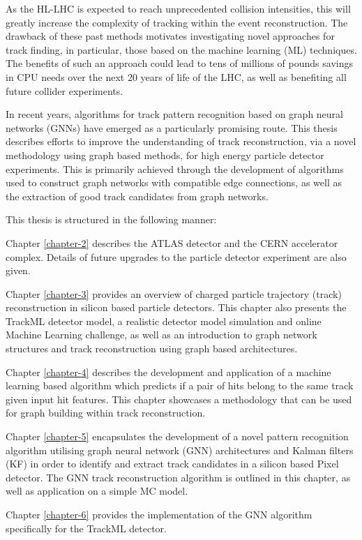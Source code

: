 As the HL-LHC is expected to reach unprecedented collision intensities, this will greatly increase the complexity of tracking within the event reconstruction. The drawback of these past methods motivates investigating novel approaches for track finding, in particular, those based on the machine learning (ML) techniques. The benefits of such an approach could lead to tens of millions of pounds savings in CPU needs over the next 20 years of life of the LHC, as well as benefiting all future collider experiments.

In recent years, algorithms for track pattern recognition based on graph neural networks (GNNs) have emerged as a particularly promising route. This thesis describes efforts to improve the understanding of track reconstruction, via a novel methodology using graph based methods, for high energy particle detector experiments. This is primarily achieved through the development of algorithms used to construct graph networks with compatible edge connections, as well as the extraction of good track candidates from graph networks. 

This thesis is structured in the following manner:

Chapter \ref{chapter-2} describes the ATLAS detector and the CERN accelerator complex. Details of future upgrades to the particle detector experiment are also given.

Chapter \ref{chapter-3} provides an overview of charged particle trajectory (track) reconstruction in silicon based particle detectors. This chapter also presents the TrackML detector model, a realistic detector model simulation and online Machine Learning challenge, as well as an introduction to graph network structures and track reconstruction using graph based architectures.

Chapter \ref{chapter-4} describes the development and application of a machine learning based algorithm which predicts if a pair of hits belong to the same track given input hit features. This chapter showcases a methodology that can be used for graph building within track reconstruction.

Chapter \ref{chapter-5} encapsulates the development of a novel pattern recognition algorithm utilising graph neural network (GNN) architectures and Kalman filters (KF) in order to identify and extract track candidates in a silicon based Pixel detector. The GNN track reconstruction algorithm is outlined in this chapter, as well as application on a simple MC model.

Chapter \ref{chapter-6} provides the implementation of the GNN algorithm specifically for the TrackML detector.

